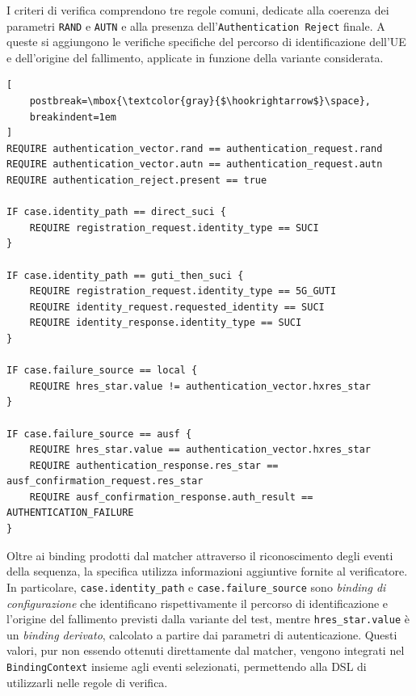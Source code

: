 I criteri di verifica comprendono tre regole comuni, dedicate alla coerenza dei parametri \texttt{RAND} e \texttt{AUTN} e alla presenza dell'\texttt{Authentication\ Reject} finale. A queste si aggiungono le verifiche specifiche del percorso di identificazione dell'UE e dell'origine del fallimento, applicate in funzione della variante considerata.

\par\noindent\begin{minipage}{\linewidth}
\begin{lstlisting}[
    postbreak=\mbox{\textcolor{gray}{$\hookrightarrow$}\space},
    breakindent=1em
]
REQUIRE authentication_vector.rand == authentication_request.rand
REQUIRE authentication_vector.autn == authentication_request.autn
REQUIRE authentication_reject.present == true

IF case.identity_path == direct_suci {
    REQUIRE registration_request.identity_type == SUCI
}

IF case.identity_path == guti_then_suci {
    REQUIRE registration_request.identity_type == 5G_GUTI
    REQUIRE identity_request.requested_identity == SUCI
    REQUIRE identity_response.identity_type == SUCI
}

IF case.failure_source == local {
    REQUIRE hres_star.value != authentication_vector.hxres_star
}

IF case.failure_source == ausf {
    REQUIRE hres_star.value == authentication_vector.hxres_star
    REQUIRE authentication_response.res_star == ausf_confirmation_request.res_star
    REQUIRE ausf_confirmation_response.auth_result == AUTHENTICATION_FAILURE
}
\end{lstlisting}
\end{minipage}\par


Oltre ai binding prodotti dal matcher attraverso il riconoscimento degli eventi della sequenza, la specifica utilizza informazioni aggiuntive fornite al verificatore. In particolare, \texttt{case.identity\_path} e \texttt{case.failure\_source} sono \emph{binding di configurazione} che identificano rispettivamente il percorso di identificazione e l'origine del fallimento previsti dalla variante del test, mentre \texttt{hres\_star.value} è un \emph{binding derivato}, calcolato a partire dai parametri di autenticazione. Questi valori, pur non essendo ottenuti direttamente dal matcher, vengono integrati nel \texttt{BindingContext} insieme agli eventi selezionati, permettendo alla DSL di utilizzarli nelle regole di verifica.

